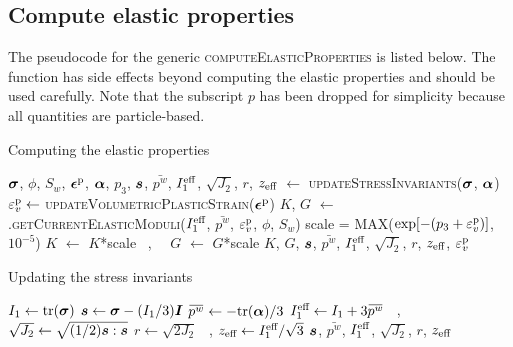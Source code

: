 \subsection{Compute elastic properties}
  The pseudocode for the generic \textsc{computeElasticProperties} is listed below.  The function 
  has side effects beyond computing the elastic properties and should be used carefully. Note that
  the subscript $p$ has been dropped for simplicity because all quantities are particle-based.
  \begin{breakablealgorithm}
  \caption{Computing the elastic properties}
  \begin{algorithmic}[1]
    \Require $\boldsymbol{\sigma}$, $\phi$, $S_w$, $\boldsymbol{\epsilon}^{\text{p}}$, $\boldsymbol{\alpha}$, $p_3$, 
      \State $\boldsymbol{s}$, $\bar{p^w}$, $I_1^{\text{eff}}$, $\sqrt{J_2}$, $r$, $z_{\text{eff}}$ $\leftarrow$
             \textsc{updateStressInvariants}($\boldsymbol{\sigma}$, $\boldsymbol{\alpha}$)
      \State $\varepsilon_v^{\text{p}} \leftarrow$
             \textsc{updateVolumetricPlasticStrain}($\boldsymbol{\epsilon}^{\text{p}}$)
      \State $K$, $G$ $\leftarrow$ .\textsc{getCurrentElasticModuli}($I_1^{\text{eff}}$, 
          $\bar{p^w}$, $\varepsilon_v^{\text{p}}$, $\phi$, $S_w$)
        \State scale = MAX($\exp[-(p_3 + \varepsilon_v^{\text{p}})]$, $10^{-5}$)
        \State $K$ $\leftarrow$ $K$*scale ~,~~ $G$ $\leftarrow$ $G$*scale
      \EndIf
      \State \Return $K$, $G$, $\boldsymbol{s}$, $\bar{p^w}$, $I_1^{\text{eff}}$, $\sqrt{J_2}$, $r$, $z_{\text{eff}}$, $\varepsilon_v^{\text{p}}$
    \EndProcedure
  \end{algorithmic}
  \end{breakablealgorithm}

  \begin{breakablealgorithm}
  \caption{Updating the stress invariants}
  \begin{algorithmic}[1]
      \State $I_1 \leftarrow \text{tr}(\boldsymbol{\sigma})$
      \State $\boldsymbol{s} \leftarrow \boldsymbol{\sigma} - (I_1/3)\boldsymbol{I}$
      \State $\bar{p^w} \leftarrow -\Tr(\Balpha)/3$
      \State $I_1^\Teff \leftarrow I_1 + 3\bar{p^w}$ ~,\quad
             $\sqrt{J_2} \leftarrow \sqrt{(1/2) \boldsymbol{s}:\boldsymbol{s}}$
      \State $r \leftarrow \sqrt{2 J_2}$ ~,\quad
             $z_{\text{eff}} \leftarrow I_1^{\text{eff}}/\sqrt{3}$
      \State \Return $\boldsymbol{s}$, $\bar{p^w}$, $I_1^{\text{eff}}$, $\sqrt{J_2}$, $r$, $z_{\text{eff}}$
    \EndProcedure
  \end{algorithmic}
  \end{breakablealgorithm}


